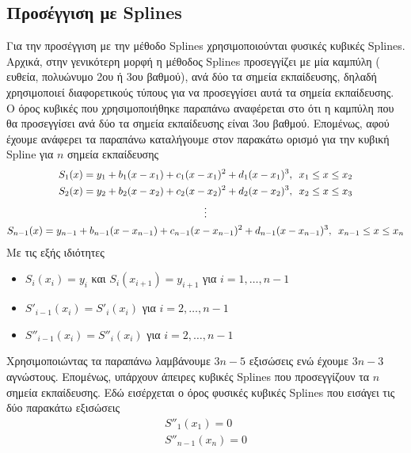 \documentclass[Second Project.tex]{subfiles}
\begin{document}
\subsection{ Προσέγγιση με \textlatin{Splines} }

Για την προσέγγιση με την μέθοδο \textlatin{Splines} χρησιμοποιούνται φυσικές κυβικές \textlatin{Splines}. Αρχικά, 
στην γενικότερη μορφή η μέθοδος \textlatin{Splines} προσεγγίζει με μία καμπύλη ( ευθεία, πολυώνυμο 2ου ή 3ου βαθμού),
ανά δύο τα σημεία εκπαίδευσης, δηλαδή χρησιμοποιεί διαφορετικούς τύπους για να προσεγγίσει αυτά τα σημεία εκπαίδευσης.
Ο όρος κυβικές που χρησιμοποιήθηκε παραπάνω αναφέρεται στο ότι η καμπύλη που θα προσεγγίσει ανά δύο τα σημεία εκπαίδευσης
είναι 3ου βαθμού. Επομένως, αφού έχουμε ανάφερει τα παραπάνω καταλήγουμε στον παρακάτω ορισμό για την κυβική 
\textlatin{Spline} για $n$ σημεία εκπαίδευσης
\begin{gather*}
    S_{1}(x) = y_{1} +b_{1}(x-x_{1}) + c_{1}(x-x_{1})^{2} + d_{1}(x-x_{1})^{3} , \hspace{5px} x_{1} \leq x \leq x_{2} \\
    S_{2}(x) = y_{2} +b_{2}(x-x_{2}) + c_{2}(x-x_{2})^{2} + d_{2}(x-x_{2})^{3} , \hspace{5px} x_{2} \leq x \leq x_{3} \\ 
    \vdots \\
    S_{n-1}(x) = y_{n-1} +b_{n-1}(x-x_{n-1}) + c_{n-1}(x-x_{n-1})^{2} + d_{n-1}(x-x_{n-1})^{3} , \hspace{5px} x_{n-1} \leq x \leq x_{n} \\
\end{gather*}
Με τις εξής ιδιότητες 
\begin{itemize}
    \item $S_{i}(x_{i}) = y_{i} $ και $S_{i}(x_{i+1}) = y_{i+1} $ \hspace{5px} για \hspace{5px}$i = 1, \dots , n-1$
    \item $ S'_{i-1}(x_{i}) = S'_{i}(x_{i}) $ \hspace{5px} για \hspace{5px}$i = 2, \dots, n-1$
    \item $S''_{i-1}(x_{i}) = S''_{i}(x_{i}) $ \hspace{5px} για \hspace{5px}$i = 2, \dots, n-1$
\end{itemize}
Χρησιμοποιώντας τα παραπάνω λαμβάνουμε $3n-5$ εξισώσεις ενώ έχουμε $3n-3$ αγνώστους. Επομένως, υπάρχουν άπειρες κυβικές \textlatin{Splines}
που προσεγγίζουν τα $n$ σημεία εκπαίδευσης. Εδώ εισέρχεται ο όρος φυσικές κυβικές \textlatin{Splines} που εισάγει τις δύο παρακάτω εξισώσεις
\begin{gather*}
    S''_{1}(x_{1}) = 0 \\
    S''_{n-1}(x_{n}) = 0
\end{gather*}
\end{document}

